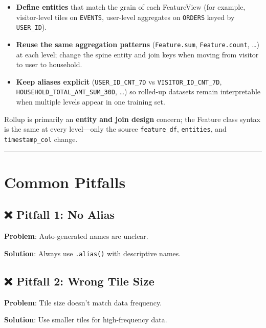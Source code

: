 \documentclass[
  letterpaper,
  DIV=11,
  numbers=noendperiod]{scrreprt}
\providecommand{\tightlist}{%
  \setlength{\itemsep}{0pt}\setlength{\parskip}{0pt}}\usepackage{longtable,booktabs,array}
\begin{document}
\begin{itemize}
\tightlist
\item
  \textbf{Define entities} that match the grain of each FeatureView (for
  example, visitor-level tiles on \texttt{EVENTS}, user-level aggregates
  on \texttt{ORDERS} keyed by \texttt{USER\_ID}).
\item
  \textbf{Reuse the same aggregation patterns} (\texttt{Feature.sum},
  \texttt{Feature.count}, \ldots) at each level; change the spine entity
  and join keys when moving from visitor to user to household.
\item
  \textbf{Keep aliases explicit} (\texttt{USER\_ID\_CNT\_7D} vs
  \texttt{VISITOR\_ID\_CNT\_7D},
  \texttt{HOUSEHOLD\_TOTAL\_AMT\_SUM\_30D}, \ldots) so rolled-up
  datasets remain interpretable when multiple levels appear in one
  training set.
\end{itemize}

Rollup is primarily an \textbf{entity and join design} concern; the
Feature class syntax is the same at every level---only the source
\texttt{feature\_df}, \texttt{entities}, and \texttt{timestamp\_col}
change.

\begin{center}\rule{0.5\linewidth}{0.5pt}\end{center}

\hypertarget{common-pitfalls-5}{%
\section{Common Pitfalls}\label{common-pitfalls-5}}

\hypertarget{pitfall-1-no-alias}{%
\subsection{❌ Pitfall 1: No Alias}\label{pitfall-1-no-alias}}

\textbf{Problem}: Auto-generated names are unclear.

\textbf{Solution}: Always use \texttt{.alias()} with descriptive names.

\hypertarget{pitfall-2-wrong-tile-size}{%
\subsection{❌ Pitfall 2: Wrong Tile
Size}\label{pitfall-2-wrong-tile-size}}

\textbf{Problem}: Tile size doesn't match data frequency.

\textbf{Solution}: Use smaller tiles for high-frequency data.
\end{document}
